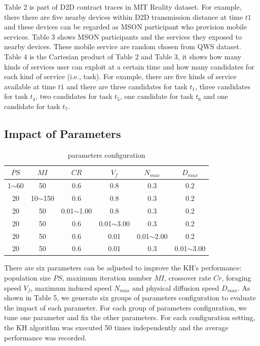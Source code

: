 \documentclass[journal]{IEEEtran}
\begin{document}
Table 2 is part of D2D contract traces in MIT Reality dataset. For example, there there are five nearby devices within D2D transmission distance at time $t1$ and these devices can be regarded as MSON participant who provision mobile services. Table 3 shows MSON participants and the services they exposed to nearby devices. These mobile service are random chosen from QWS dataset. Table 4 is the Cartesian product of Table 2 and Table 3, it shows how many kinds of services user can exploit at a certain time and how many candidates for each kind of service (i.e., task). For example, there are five kinds of service available at time $t1$ and there are three candidates for task $t_1$, three candidates for task $t_4$, two candidates for task $t_5$, one candidate for task $t_6$ and one candidate for task $t_7$.

\subsection{Impact of Parameters}
\begin{table}[!t]
\renewcommand{\arraystretch}{1.3}
\caption{parameters configuration}
\label{table_example}
\centering
\begin{tabular}{cccccc}
\hline
\bfseries $PS$ & \bfseries $MI$ & \bfseries $CR$ & \bfseries $V_f$ & \bfseries $N_{max}$ & \bfseries $D_{max}$ \\
\hline
1$\sim$60 & 50          & 0.6            & 0.8            &  0.3            &  0.2 \\
20        & 10$\sim$150 & 0.6            & 0.8            &  0.3            &  0.2 \\
20        & 50          & 0.01$\sim$1.00 & 0.8            &  0.3            &  0.2 \\
20        & 50          & 0.6            & 0.01$\sim$3.00 &  0.3            &  0.2 \\
20        & 50          & 0.6            & 0.01           &  0.01$\sim$2.00 &  0.2 \\
20        & 50          & 0.6            & 0.01           &  0.3            &  0.01$\sim$3.00 \\
\hline
\end{tabular}
\end{table}

There are six parameters can be adjusted to improve the KH's performance: population size $PS$, maximum iteration number $MI$, crossover rate $Cr$, foraging speed $V_f$, maximum induced speed $N_{max}$ and physical diffusion speed $D_{max}$. As shown in Table 5, we generate six groups of parameters configuration to evaluate the impact of each parameter. For each group of parameters configuration, we tune one parameter and fix the other parameters. For each configuration setting, the KH algorithm was executed 50 times independently and the average performance was recorded.
\end{document}
